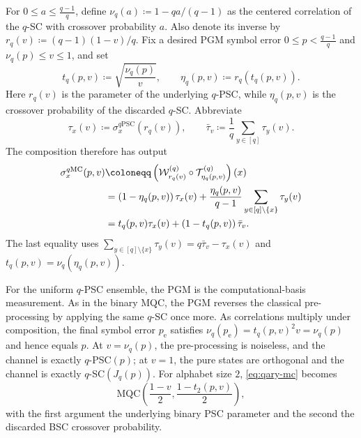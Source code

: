 \documentclass[11pt]{article}
\renewcommand{\leq}{\leqslant}
\theoremstyle{remark}
\newcommand{\MQC}{\mathrm{MQC}}
\begin{document}
For $0 \leq a \leq \frac{q-1}{q}$, define $\nu_q(a) \coloneqq 1-qa/(q-1)$ as the centered correlation of the $q$-SC with crossover probability $a$. Also denote its inverse by $r_q(v) \coloneqq (q-1)(1-v)/q$. Fix a desired PGM symbol error $0 \leq p < \frac{q-1}{q}$ and $\nu_q(p) \leq v \leq 1$, and set
\begin{equation*}
t_q(p,v) \coloneqq \sqrt{\frac{\nu_q(p)}{v}},
\qquad
\eta_q(p,v) \coloneqq r_q\left(t_q(p,v)\right).
\end{equation*}
Here $r_q(v)$ is the parameter of the underlying $q$-PSC, while $\eta_q(p,v)$ is the crossover probability of the discarded $q$-SC. Abbreviate
\begin{equation*}
\tau_x(v) \coloneqq \sigma_x^{q\mathrm{PSC}}\left(r_q(v)\right),
\qquad
\bar{\tau}_v \coloneqq \frac{1}{q}\sum_{y \in [q]}{\tau_y(v)}.
\end{equation*}
The composition therefore has output
\begin{align}
\sigma_x^{q\mathrm{MC}}(p,v)
&\coloneqq
\left(\mathcal{W}^{(q)}_{r_q(v)} \circ
\mathcal{T}^{(q)}_{\eta_q(p,v)}\right)(x) \notag \\
&=\left(1-\eta_q(p,v)\right)\tau_x(v)
+\frac{\eta_q(p,v)}{q-1}
\sum_{y \in [q]\setminus\{x\}}{\tau_y(v)} \notag \\
&=t_q(p,v)\tau_x(v)
+\left(1-t_q(p,v)\right)\bar{\tau}_v.
\label{eq:qary-mc}
\end{align}
The last equality uses $\sum_{y \in [q] \setminus \{x\}}{\tau_y(v)} = q\bar{\tau}_v-\tau_x(v)$ and $t_q(p,v) = \nu_q(\eta_q(p,v))$.

For the uniform $q$-PSC ensemble, the PGM is the computational-basis measurement. As in the binary MQC, the PGM reverses the classical pre-processing by applying the same $q$-SC once more. As correlations multiply under composition, the final symbol error $p_{\mathrm{e}}$ satisfies $\nu_q(p_{\mathrm{e}})=t_q(p,v)^2v=\nu_q(p)$ and hence equals $p$. At $v = \nu_q(p)$, the pre-processing is noiseless, and the channel is exactly $q$-PSC$(p)$; at $v = 1$, the pure states are orthogonal and the channel is exactly $q$-SC$(J_q(p))$. For alphabet size $2$, \eqref{eq:qary-mc} becomes
\begin{equation*}
\MQC\left(\frac{1-v}{2},\frac{1-t_2(p,v)}{2}\right),
\end{equation*}
with the first argument the underlying binary PSC parameter and the second the discarded BSC crossover probability.
\end{document}
